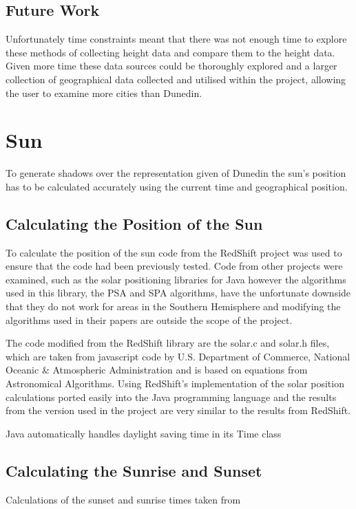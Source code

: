 \documentclass[12pt]{report}
\begin{document}
\subsection{Future Work}
Unfortunately time constraints meant that there was not enough time to explore these methods of collecting height data and compare them to the height data.
 Given more time these data sources could be thoroughly explored and a larger collection of geographical data collected and utilised within the project, allowing the user to examine more cities than Dunedin.

\section{Sun}
To generate shadows over the representation given of Dunedin the sun's position has to be calculated accurately using the current time and geographical position.


\subsection{Calculating the Position of the Sun}
To calculate the position of the sun code from the RedShift project\cite{redshift} was used to ensure that the code had been previously tested. Code from other projects were examined, such as the solar positioning libraries for Java\cite{javasunlib} however the algorithms used in this library, the PSA\cite{psa} and SPA\cite{spa} algorithms, have the unfortunate downside that they do not work for areas in the Southern Hemisphere and modifying the algorithms used in their papers are outside the scope of the project.

The code modified from the RedShift library are the solar.c and solar.h files, which are taken from javascript code by U.S. Department of Commerce, National Oceanic & Atmospheric Administration\cite{usnoaa} and is based on equations from Astronomical Algorithms\cite{astronomicalalgorithms}. Using RedShift's implementation of the solar position calculations ported easily into the Java programming language and the results from the version used in the project are very similar to the results from RedShift.

Java automatically handles daylight saving time in its Time class

\subsection{Calculating the Sunrise and Sunset}
Calculations of the sunset and sunrise times taken from \cite{sunrise} 
\end{document}
